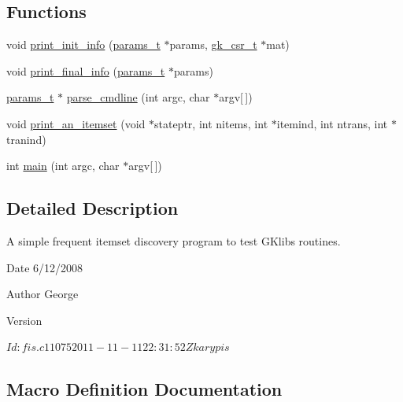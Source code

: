 \subsection*{Functions}
\begin{DoxyCompactItemize}
\item 
void \hyperlink{a00146_a2270624f104a1d261314dd112e4a1d1d}{print\+\_\+init\+\_\+info} (\hyperlink{a00706}{params\+\_\+t} $\ast$params, \hyperlink{a00634}{gk\+\_\+csr\+\_\+t} $\ast$mat)
\item 
void \hyperlink{a00146_a702976a4c55992ddbfc1918ec1b70943}{print\+\_\+final\+\_\+info} (\hyperlink{a00706}{params\+\_\+t} $\ast$params)
\item 
\hyperlink{a00706}{params\+\_\+t} $\ast$ \hyperlink{a00146_aea2aa8c9b5bb7c64a3f316d7760f0341}{parse\+\_\+cmdline} (int argc, char $\ast$argv\mbox{[}$\,$\mbox{]})
\item 
void \hyperlink{a00146_a3b3cc293672156bbc5026fd567f52462}{print\+\_\+an\+\_\+itemset} (void $\ast$stateptr, int nitems, int $\ast$itemind, int ntrans, int $\ast$tranind)
\item 
int \hyperlink{a00146_a0ddf1224851353fc92bfbff6f499fa97}{main} (int argc, char $\ast$argv\mbox{[}$\,$\mbox{]})
\end{DoxyCompactItemize}


\subsection{Detailed Description}
A simple frequent itemset discovery program to test G\+Klib\textquotesingle{}s routines. 

\begin{DoxyDate}{Date}
6/12/2008 
\end{DoxyDate}
\begin{DoxyAuthor}{Author}
George 
\end{DoxyAuthor}
\begin{DoxyVersion}{Version}
\begin{DoxyVerb}$Id: fis.c 11075 2011-11-11 22:31:52Z karypis $ \end{DoxyVerb}
 
\end{DoxyVersion}


\subsection{Macro Definition Documentation}
\mbox{\label{a00146_a431c4dd9dfee6eda132e882f0d19bdc7}} 
